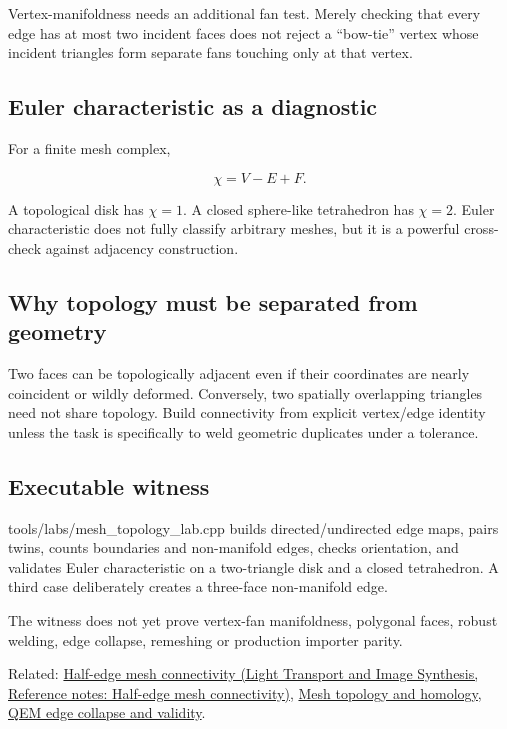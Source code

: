 Vertex-manifoldness needs an additional fan test. Merely checking that every edge has at most two incident faces does not reject a ``bow-tie'' vertex whose incident triangles form separate fans touching only at that vertex.

\subsection{Euler characteristic as a diagnostic}\label{appendix-faac749c9cdd-euler-characteristic-as-a-diagnostic}

\hypertarget{appendix-faac749c9cdd-euler-characteristic-as-a-diagnostic}{}

For a finite mesh complex,

\[
\chi = V-E+F.
\]

A topological disk has \(\chi=1\). A closed sphere-like tetrahedron has \(\chi=2\). Euler characteristic does not fully classify arbitrary meshes, but it is a powerful cross-check against adjacency construction.

\subsection{Why topology must be separated from geometry}\label{appendix-faac749c9cdd-why-topology-must-be-separated-from-geometry}

\hypertarget{appendix-faac749c9cdd-why-topology-must-be-separated-from-geometry}{}

Two faces can be topologically adjacent even if their coordinates are nearly coincident or wildly deformed. Conversely, two spatially overlapping triangles need not share topology. Build connectivity from explicit vertex/edge identity unless the task is specifically to weld geometric duplicates under a tolerance.

\subsection{Executable witness}\label{appendix-faac749c9cdd-executable-witness}

\hypertarget{appendix-faac749c9cdd-executable-witness}{}

tools/labs/mesh\_topology\_lab.cpp builds directed/undirected edge maps, pairs twins, counts boundaries and non-manifold edges, checks orientation, and validates Euler characteristic on a two-triangle disk and a closed tetrahedron. A third case deliberately creates a three-face non-manifold edge.

The witness does not yet prove vertex-fan manifoldness, polygonal faces, robust welding, edge collapse, remeshing or production importer parity.

Related: \href{../04-Light-Transport-and-Image-Synthesis/main.pdf\#nameddest=appendix-1aea26b2307f}{Half-edge mesh connectivity (Light Transport and Image Synthesis, Reference notes: Half-edge mesh connectivity)}, \hyperref[appendix-e38976cbbf86]{Mesh topology and homology}, \hyperref[appendix-89db9fe1bc8a]{QEM edge collapse and validity}.
